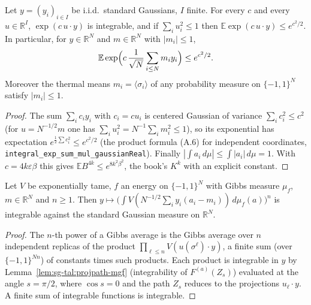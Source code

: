 \begin{lemma}
\label{lem:sg-tal:thermal-factor-moment}
  \leanok
{}
Let $y=(y_i)_{i\in I}$ be i.i.d.\ standard Gaussians, $I$ finite.  For every $c$ and every $u\in\mathbb R^I$, $\exp(c\,u\cdot y)$ is integrable, and if $\sum_iu_i^2\le1$ then $\mathbb E\exp(c\,u\cdot y)\le e^{c^2/2}$.  In particular, for $y\in\mathbb R^N$ and $m\in\mathbb R^N$ with $|m_i|\le1$,
\[
\mathbb E\exp\Bigl(c\,\frac1{\sqrt N}\sum_{i\le N}m_iy_i\Bigr)\le e^{c^2/2}.
\]
Moreover the thermal means $m_i=\langle\sigma_i\rangle$ of any probability measure on $\{-1,1\}^N$ satisfy $|m_i|\le1$.
\end{lemma}
\begin{proof}
  \leanok
The sum $\sum_ic_iy_i$ with $c_i=cu_i$ is centered Gaussian of variance $\sum_ic_i^2\le c^2$ (for $u=N^{-1/2}m$ one has $\sum_iu_i^2=N^{-1}\sum_im_i^2\le1$), so its exponential has expectation $e^{\frac12\sum c_i^2}\le e^{c^2/2}$ (the product formula (A.6) for independent coordinates, \texttt{integral\_exp\_sum\_mul\_gaussianReal}).  Finally $|\int a_i\,d\mu|\le\int|a_i|\,d\mu=1$.
With $c=4k\varepsilon\beta$ this gives $\mathbb E B^{4k}\le e^{8k^2\beta^2}$, the book's $K^k$ with an explicit constant.
\end{proof}

\begin{lemma}
\label{lem:sg-tal:gibbs-pow-integrable}
  \leanok
{}
Let $V$ be exponentially tame, $f$ an energy on $\{-1,1\}^N$ with Gibbs measure $\mu_f$, $m\in\mathbb R^N$ and $n\ge1$.  Then $y\mapsto\bigl(\int V(N^{-1/2}\sum_iy_i(a_i-m_i))\,d\mu_f(a)\bigr)^n$ is integrable against the standard Gaussian measure on $\mathbb R^N$.
\end{lemma}
\begin{proof}
  \leanok
The $n$-th power of a Gibbs average is the Gibbs average over $n$ independent replicas of the product $\prod_{\ell\le n}V(u(\sigma^\ell)\cdot y)$, a finite sum (over $\{-1,1\}^{Nn}$) of constants times such products.  Each product is integrable in $y$ by Lemma~\ref{lem:sg-tal:projpath-mgf} (integrability of $F^{(a)}(Z_s)$) evaluated at the angle $s=\pi/2$, where $\cos s=0$ and the path $Z_s$ reduces to the projections $u_\ell\cdot y$.  A finite sum of integrable functions is integrable.
\end{proof}

